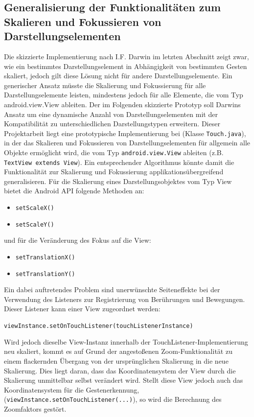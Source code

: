 \documentclass[12pt,oneside,a4paper,bibtotoc,liststotoc]{scrreprt}
\begin{document}
\subsection{Generalisierung der Funktionalitäten zum Skalieren und Fokussieren von Darstellungselementen}
Die skizzierte Implementierung nach I.F. Darwin im letzten Abschnitt zeigt zwar, wie ein bestimmtes Darstellungselement in Abhängigkeit von bestimmten Gesten skaliert, jedoch gilt diese Lösung nicht für andere Darstellungselemente. Ein generischer Ansatz müsste die Skalierung und Fokussierung für alle Darstellungselemente leisten, mindestens jedoch für alle Elemente, die vom Typ android.view.View ableiten.\newline
Der im Folgenden skizzierte Prototyp soll Darwins Ansatz um eine dynamische Anzahl von Darstellungselementen mit der Kompatibilität zu unterschiedlichen Darstellungstypen erweitern.
Dieser Projektarbeit liegt eine prototypische Implementierung bei (Klasse \texttt{Touch.java}), in der das Skalieren und Fokussieren von Darstellungselementen für allgemein alle Objekte ermöglicht wird, die vom Typ \texttt{android.view.View} ableiten (z.B. \texttt{TextView extends View}). Ein entsprechender Algorithmus könnte damit die Funktionalität zur Skalierung und Fokussierung applikationsübergreifend generalisieren. 
Für die Skalierung eines Darstellungsobjektes vom Typ View bietet die Android API folgende Methoden an:
\begin{itemize}
\item \texttt{setScaleX()}
\item \texttt{setScaleY()}
\end{itemize}
und für die Veränderung des Fokus auf die View:
\begin{itemize}
\item \texttt{setTranslationX()}
\item \texttt{setTranslationY()}
\end{itemize}
Ein dabei auftretendes Problem sind unerwünschte Seiteneffekte bei der Verwendung des Listeners zur Registrierung von Berührungen und Bewegungen. Dieser Listener kann einer View zugeordnet werden:
\centerline{\texttt{viewInstance.setOnTouchListener(touchListenerInstance)}}\newline \newline
Wird jedoch dieselbe View-Instanz innerhalb der TouchListener-Implementierung neu skaliert, kommt es auf Grund der angestoßenen Zoom-Funktionalität zu einem flackernden Übergang von der ursprünglichen Skalierung in die neue Skalierung. Dies liegt daran, dass das Koordinatensystem der View durch die Skalierung unmittelbar selbst verändert wird. Stellt diese View jedoch auch das Koordinatensystem für die Gestenerkennung, (\texttt{viewInstance.setOnTouchListener(...)}), so wird die Berechnung des Zoomfaktors gestört.
\end{document}
